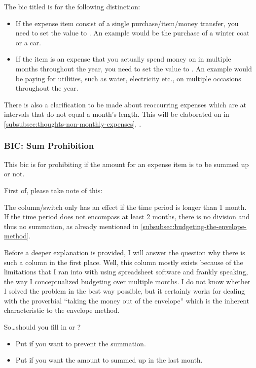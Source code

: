 The \ac{bic} titled  is for the following distinction:
\begin{itemize}
	\item If the expense item consist of a single purchase/item/money transfer, you need to set the value to .
	An example would be the purchase of a winter coat or a car.
	\item If the item is an expense that you actually spend money on in multiple months throughout the year, you need to set the value to .
	An example would be paying for \eg utilities, such as water, electricity etc., on multiple occasions throughout the year.
\end{itemize}

There is also a clarification to be made about reoccurring expenses which are at intervals that do not equal a month's length.
This will be elaborated on in \autoref{subsubsec:thoughts-non-monthly-expenses}, .

\subsubsection{BIC: Sum Prohibition}
\label{subsubsec:bic-sum-prohibition}

This \ac{bic} is for prohibiting if the amount for an expense item is to be summed up or not.

First of, please take note of this:
\begin{specialnote}
	The column/switch  only has an effect if the time period is longer than 1 month.
	If the time period does not encompass at least 2 months, there is no division and thus no summation, as already mentioned in \autoref{subsubsec:budgeting-the-envelope-method}.
\end{specialnote}

Before a deeper explanation is provided, I will answer the question why there is such a column in the first place.
Well, this column mostly exists because of the limitations that I ran into with using spreadsheet software and frankly speaking, the way I conceptualized budgeting over multiple months.
I do not know whether I solved the problem in the best way possible, but it certainly works for dealing with the proverbial ``taking the money out of the envelope'' which is the inherent characteristic to the envelope method.

So\ldots should you fill in  or ?
\begin{itemize}
	\item Put  if you want to prevent the summation.
	\item Put  if you want the amount to summed up in the last month.
\end{itemize}

